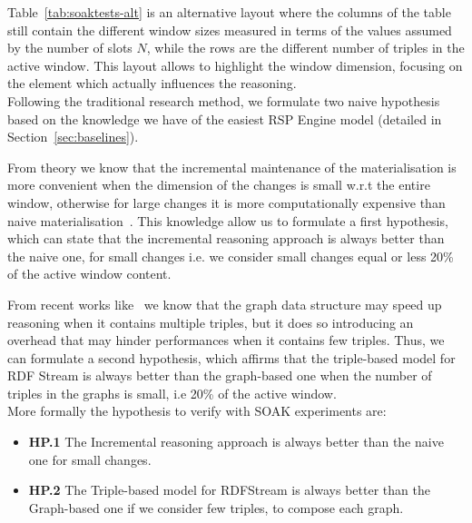 Table~\ref{tab:soaktests-alt} is an alternative layout where the columns of the table still contain the different window sizes measured in terms of the values assumed by the number of slots $N$, while the rows are the different number of triples in the active window. This layout allows to highlight the window dimension, focusing on the element which actually influences the reasoning.\\

\noindent Following the traditional research method, we formulate two naive hypothesis based on the knowledge we have of the easiest RSP Engine model (detailed in Section~\ref{sec:baselines}). 

From theory we know that the incremental maintenance of the materialisation is more convenient when the dimension of the changes is small w.r.t the entire window, otherwise  for large changes it is more computationally expensive than naive materialisation~\cite{DellAglio2014,DBLP:conf/cikm/RenP11,DBLP:conf/semweb/UrbaniMJHB13}.
This knowledge allow us to formulate a first hypothesis, which can state that the incremental reasoning approach is always better than the naive one, for small changes i.e. we consider small changes equal or less 20\% of the active window content.

From recent works like~\cite{DBLP:conf/semweb/BalduiniVDTPC13} we know that the graph data structure may speed up reasoning when it contains multiple triples, but it does so introducing an overhead that may hinder performances when it contains few triples. Thus, we can formulate a second hypothesis, which affirms that the triple-based model for RDF Stream is always better than the graph-based one when the number of triples in the graphs is small, i.e 20\% of the active window.\\

More formally the hypothesis to verify with SOAK experiments are:
\begin{itemize}
\item \textbf{HP.1} The Incremental reasoning approach is always better than the naive one for small changes.
\item \textbf{HP.2} The Triple-based model for RDFStream is always better than the Graph-based one if we consider few triples, to compose each graph.
\end{itemize}


